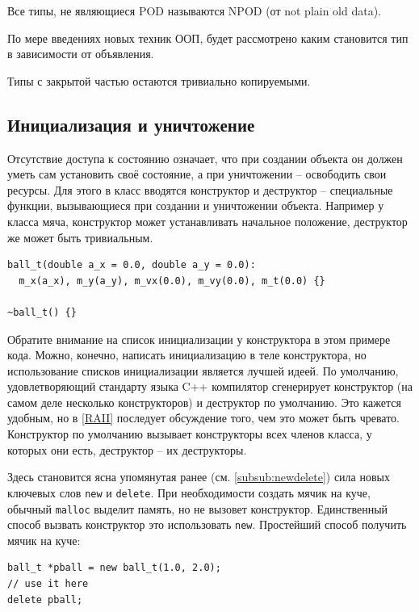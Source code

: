 \documentclass[a4paper,12pt,oneside]{book}
\begin{document}
Все типы, не являющиеся POD называются NPOD (от not plain old data).

По мере введениях новых техник ООП, будет рассмотрено каким становится тип в зависимости от объявления.

Типы с закрытой частью остаются тривиально копируемыми.

\subsection{Инициализация и уничтожение}\label{subsub:constrdestr}

Отсутствие доступа к состоянию означает, что при создании объекта он должен уметь сам установить своё состояние, а при уничтожении – освободить свои ресурсы. Для этого в класс вводятся конструктор и деструктор – специальные функции, вызывающиеся при создании и уничтожении объекта. Например у класса мяча, конструктор может устанавливать начальное положение, деструктор же может быть тривиальным.

\begin{lstlisting}
ball_t(double a_x = 0.0, double a_y = 0.0):
  m_x(a_x), m_y(a_y), m_vx(0.0), m_vy(0.0), m_t(0.0) {}

~ball_t() {}
\end{lstlisting}

Обратите внимание на список инициализации у конструктора в этом примере кода. Можно, конечно, написать инициализацию в теле конструктора, но использование списков инициализации является лучшей идеей. По умолчанию, удовлетворяющий стандарту языка C++ компилятор сгенерирует конструктор (на самом деле несколько конструкторов) и деструктор по умолчанию. Это кажется удобным, но в \ref{RAII} последует обсуждение того, чем это может быть чревато. Конструктор по умолчанию вызывает конструкторы всех членов класса, у которых они есть, деструктор -- их деструкторы.

Здесь становится ясна упомянутая ранее (см. \ref{subsub:newdelete}) сила новых ключевых слов \lstinline!new! и \lstinline!delete!. При необходимости создать мячик на куче, обычный \lstinline!malloc! выделит память, но не вызовет конструктор. Единственный способ вызвать конструктор это использовать \lstinline!new!. Простейший способ получить мячик на куче:

\begin{lstlisting}
ball_t *pball = new ball_t(1.0, 2.0);
// use it here
delete pball;
\end{lstlisting}
\end{document}
